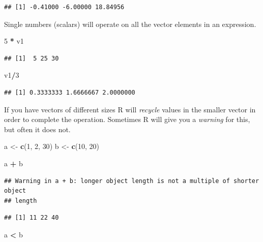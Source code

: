 \documentclass[
]{book}
\newenvironment{Shaded}{\begin{snugshade}}{\end{snugshade}}
\newcommand{\DecValTok}[1]{\textcolor[rgb]{0.00,0.00,0.81}{#1}}
\newcommand{\KeywordTok}[1]{\textcolor[rgb]{0.13,0.29,0.53}{\textbf{#1}}}
\newcommand{\NormalTok}[1]{#1}
\newcommand{\OperatorTok}[1]{\textcolor[rgb]{0.81,0.36,0.00}{\textbf{#1}}}
\newcommand{\StringTok}[1]{\textcolor[rgb]{0.31,0.60,0.02}{#1}}
\begin{document}
\begin{verbatim}
## [1] -0.41000 -6.00000 18.84956
\end{verbatim}

Single numbers (scalars) will operate on all the vector elements in an expression.

\begin{Shaded}
\begin{Highlighting}[]
\DecValTok{5} \OperatorTok{*}\StringTok{ }\NormalTok{v1}
\end{Highlighting}
\end{Shaded}

\begin{verbatim}
## [1]  5 25 30
\end{verbatim}

\begin{Shaded}
\begin{Highlighting}[]
\NormalTok{v1}\OperatorTok{/}\DecValTok{3}
\end{Highlighting}
\end{Shaded}

\begin{verbatim}
## [1] 0.3333333 1.6666667 2.0000000
\end{verbatim}

If you have vectors of different sizes R will \emph{recycle} values in the smaller vector in order to complete the operation. Sometimes R will give you a \emph{warning} for this, but often it does not.

\begin{Shaded}
\begin{Highlighting}[]
\NormalTok{a <-}\StringTok{ }\KeywordTok{c}\NormalTok{(}\DecValTok{1}\NormalTok{, }\DecValTok{2}\NormalTok{, }\DecValTok{30}\NormalTok{)}
\NormalTok{b <-}\StringTok{ }\KeywordTok{c}\NormalTok{(}\DecValTok{10}\NormalTok{, }\DecValTok{20}\NormalTok{)}

\NormalTok{a }\OperatorTok{+}\StringTok{ }\NormalTok{b}
\end{Highlighting}
\end{Shaded}

\begin{verbatim}
## Warning in a + b: longer object length is not a multiple of shorter object
## length
\end{verbatim}

\begin{verbatim}
## [1] 11 22 40
\end{verbatim}

\begin{Shaded}
\begin{Highlighting}[]
\NormalTok{a }\OperatorTok{<}\StringTok{ }\NormalTok{b}
\end{Highlighting}
\end{Shaded}
\end{document}

